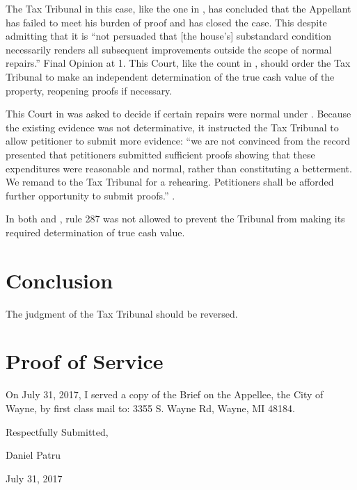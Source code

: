 \documentclass[12pt,\documentclassflag]{michiganCourtOfAppealsBrief}
\def\mathieuGast{\pincite[l]{MCL}{211.27(2)}}
\begin{document}
The Tax Tribunal in this case, like the one in \cite[s]{Jones & Laughlin}, has concluded that the Appellant has failed to meet his burden of proof and has closed the case.  This despite admitting that it is ``not persuaded that [the house's] substandard condition necessarily renders all subsequent improvements outside the scope of normal repairs.'' Final Opinion at 1. This Court, like the count in \cite[s]{Jones & Laughlin}, should order the Tax Tribunal to make an independent determination of the true cash value of the property, reopening proofs if necessary.

This Court in \cite{Fisher} was asked to decide if certain repairs were normal under \mathieuGast. Because the existing evidence was not determinative, it instructed the Tax Tribunal to allow petitioner to submit more evidence: ``we are not convinced from the record presented that petitioners submitted sufficient proofs showing that these expenditures were reasonable and normal, rather than constituting a betterment. We remand to the Tax Tribunal for a rehearing. Petitioners shall be afforded further opportunity to submit proofs.'' .

In both \cite[s]{Jones & Laughlin} and \cite[s]{Fisher}, rule 287 was not allowed to prevent the Tribunal from making its required determination of true cash value.

 
\section{Conclusion}

The judgment of the Tax Tribunal should be reversed. 
 

\section{Proof of Service}

On July 31, 2017, I served a copy of the Brief on the Appellee, the City of Wayne, by first class mail to: 3355 S. Wayne Rd, Wayne, MI 48184. 


\vspace{1\baselineskip}

{ \setlength{\leftskip}{3.5in}

  Respectfully Submitted,

  Daniel Patru

  July 31, 2017

  \setlength{\leftskip}{0pt}}
\end{document}
